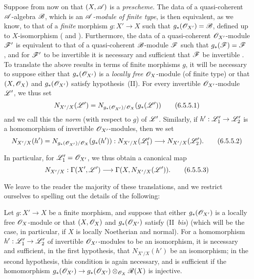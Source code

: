 \begin{env}[6.5.5]
\label{II.6.5.5}
Suppose from now on that $(X,\mathscr{A})$ is a \emph{prescheme}.
The data of a quasi-coherent $\mathscr{A}$-algebra $\mathscr{B}$, which is an \emph{$\mathscr{A}$-module of finite type}, is then equivalent, as we know, to that of a \emph{finite} morphism $g:X'\to X$ such that $g_*(\mathscr{O}_{X'})=\mathscr{B}$, defined up to $X$-isomorphism ( and ).
Furthermore, the data of a quasi-coherent $\mathscr{O}_{X'}$-module $\mathscr{F}'$ is equivalent to that of a quasi-coherent $\mathscr{B}$-module $\mathscr{F}$ such that $g_*(\mathscr{F})=\mathscr{F}$ , and for $\mathscr{F}'$ to be invertible it is necessary and sufficient that $\mathscr{F}$ be invertible .
To translate the above results in terms of finite morphisms $g$, it will be necessary to suppose either that $g_*(\mathscr{O}_{X'})$ is a \emph{locally free} $\mathscr{O}_X$-module (of finite type) or that $(X,\mathscr{O}_X)$ and $g_*(\mathscr{O}_{X'})$ satisfy hypothesis~(II).
For every invertible $\mathscr{O}_{X'}$-module $\mathscr{L}'$, we thus set
\[
\label{II.6.5.5.1}
  N_{X'/X}(\mathscr{L}') = N_{g_*(\mathscr{O}_{X'})/\mathscr{O}_X}(g_*(\mathscr{L}'))
\tag{6.5.5.1}
\]
and we call this the \emph{norm} (with respect to $g$) of $\mathscr{L}'$.
Similarly, if $h':\sh{L}'_1\to\sh{L}'_2$ is a homomorphism of invertible $\mathscr{O}_{X'}$-modules, then we set
\[
\label{II.6.5.5.2}
  N_{X'/X}(h') = N_{g_*(\sh{O}_{X'})/\sh{O}_X}(g_*(h')) : N_{X'/X}(\sh{L}'_1)\to N_{X'/X}(\sh{L}'_2).
\tag{6.5.5.2}
\]

In particular, for $\mathscr{L}'_1=\mathscr{O}_{X'}$, we thus obtain a canonical map
\[
\label{II.6.5.5.3}
  N_{X'/X} : \Gamma(X',\sh{L}') \to \Gamma(X,N_{X'/X}(\sh{L}')).
\tag{6.5.5.3}
\]

We leave to the reader the majority of these translations, and we restrict ourselves to spelling out the details of the following:
\end{env}

\begin{proposition}[6.5.6]
\label{II.6.5.6}
Let $g:X'\to X$ be a finite morphism, and suppose that either $g_*(\mathscr{O}_{X'})$ is a locally free $\mathscr{O}_X$-module or that $(X,\mathscr{O}_X)$ and $g_*(\mathscr{O}_{X'})$ satisfy (II~\emph{bis}) (which will be the case, in particular, if $X$ is locally Noetherian and normal).
For a homomorphism $h':\sh{L}'_1\to\sh{L}'_2$ of invertible $\mathscr{O}_{X'}$-modules to be an isomorphism, it is necessary and sufficient, in the first hypothesis, that $N_{X'/X}(h')$ be an isomorphism;
in the second hypothesis, this condition is again necessary, and is sufficient if the homomorphism $g_*(\sh{O}_{X'})\to g_*(\sh{O}_{X'})\otimes_{\sh{O}_X}\sh{R}(X)$ is injective.
\end{proposition}

